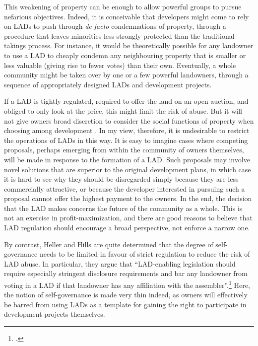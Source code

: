 This weakening of property can be enough to allow powerful groups to pursue nefarious objectives. Indeed, it is conceivable that developers might come to rely on LADs to push through {\it de facto} condemnations of property, through a procedure that leaves minorities less strongly protected than the traditional takings process. For instance, it would be theoretically possible for any landowner to use a LAD to cheaply condemn any neighbouring property that is smaller or less valuable (giving rise to fewer votes) than their own. Eventually, a whole community might be taken over by one or a few powerful landowners, through a sequence of appropriately designed LADs and development projects. %

If a LAD is tightly regulated, required to offer the land on an open auction, and obliged to only look at the price, this might limit the risk of abuse. But it will not give owners broad discretion to consider the social functions of property when choosing among development . In my view, therefore, it is undesirable to restrict the operations of LADs in this way. It is easy to imagine cases where competing proposals, perhaps emerging from within the community of owners themselves, will be made in response to the formation of a LAD. Such proposals may involve novel solutions that are superior to the original development plans, in which case it is hard to see why they should be disregarded simply because they are less commercially attractive, or because the  developer interested in pursuing such a proposal cannot offer the highest payment to the owners. In the end, the decision that the LAD makes concerns the future of the community as a whole. This is not an exercise in profit-maximization, and there are good reasons to believe that LAD regulation should encourage a broad perspective, not enforce a narrow one.

By contrast, Heller and Hills are quite determined that the degree of self-governance needs to be limited in favour of strict regulation to reduce the risk of LAD abuse. In particular, they argue that ``LAD-enabling legislation should require especially stringent disclosure requirements and bar any landowner from voting in a LAD if that landowner has any affiliation with the assembler''.\footcite{heller08} Here, the notion of self-governance is made very thin indeed, as owners will effectively be barred from using LADs as a template for gaining the right to participate in development projects themselves.

